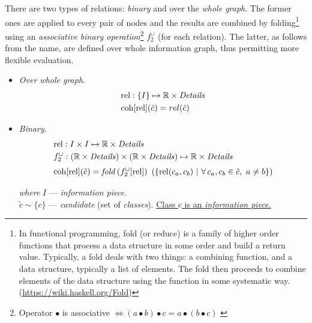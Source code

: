 \documentclass[../header]{subfiles}
\begin{document}
\begin{enumerate}
        There are two types of relations: \emph{binary} and over the \emph{whole graph}.
        The former ones are applied to every pair of nodes and the results are combined
        by folding\footnote{
          In functional programming, fold (or reduce) is a family of higher order
          functions that process a data structure in some order and build a return value.
          Typically, a fold deals with two things: a combining
          function, and a data structure, typically a list of elements.
          The fold then proceeds to combine elements of the data structure using
          the function in some systematic way. (\url{https://wiki.haskell.org/Fold})
        } using an \emph{associative binary operation}\footnote{%
          Operator $\bullet$ is associative
          $\Leftrightarrow (a \bullet b) \bullet c = a \bullet (b \bullet c)$
            \label{footnote:binary-operation}
        } $f^\cup_2$ (for each relation).
        The latter, as follows from the name, are defined over whole information graph,
        thus permitting more flexible evaluation.
        \begin{itemize}
          \item \emph{Over whole graph}.
            \begin{align*}
              & \mathrm{rel}: \lbrace I \rbrace \mapsto \mathbb{R} \times \mathit{Details} \\
              & \mathrm{coh}[\mathrm{rel}](\tilde{c}) = rel(\tilde{c})
            \end{align*}
          \item \emph{Binary}.
            \begin{align*}
              & \mathrm{rel}: I \times I \mapsto \mathbb{R} \times \mathit{Details} \\
              & f^\cup_2: (\mathbb{R} \times \mathit{Details}) \times
                          (\mathbb{R} \times \mathit{Details})
                   \mapsto \mathbb{R} \times \mathit{Details} \\[0.3em]
              & \mathrm{coh}[\mathrm{rel}](\tilde{c}) = \mathit{fold}\, (f^\cup_2[\mathrm{rel}]) ~
                  \left(\lbrace \mathrm{rel}(c_a,c_b) ~|~ \forall\, c_a,c_b \in \tilde{c}
                                          , ~ a \not= b \rbrace\right)
            \end{align*}
          \item[\emph{where}] $I$ --- \emph{information piece}. \\\noindent
                              $\tilde{c} \sim \{c\}$ --- \emph{candidate}
                              (set of \emph{classes}).
                              \underline{Class $c$ is an \emph{information piece}.}


\end{itemize}
\end{enumerate}
\end{document}
